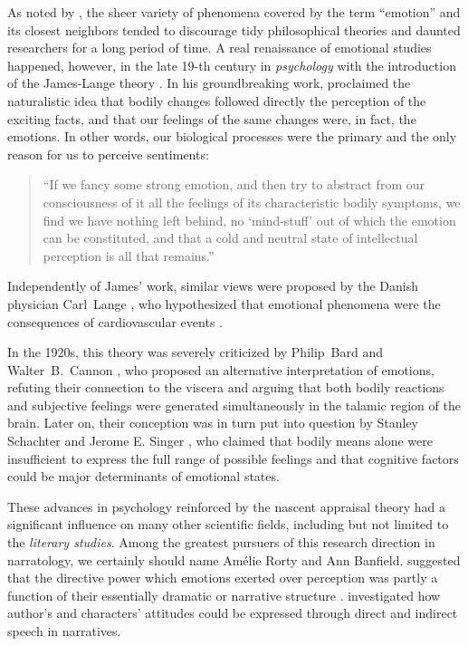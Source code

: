 As noted by \citet{Sousa:14}, the sheer variety of phenomena covered
by the term ``emotion'' and its closest neighbors tended to discourage
tidy philosophical theories and daunted researchers for a long period
of time.  A real renaissance of emotional studies happened, however,
in the late 19-th century in \emph{psychology} with the introduction
of the James-Lange theory \citep{James:1884}.  In his groundbreaking
work, \citeauthor{James:1884} proclaimed the naturalistic idea that
bodily changes followed directly the perception of the exciting facts,
and that our feelings of the same changes were, in fact, the emotions.
In other words, our biological processes were the primary and the only
reason for us to perceive sentiments:
\begin{quote}
``If we fancy some strong emotion, and then try to abstract from our
  consciousness of it all the feelings of its characteristic bodily
  symptoms, we find we have nothing left behind, no `mind-stuff' out
  of which the emotion can be constituted, and that a cold and neutral
  state of intellectual perception is all that
  remains.''\citep[p. 193]{James:1884}
\end{quote}
Independently of James' work, similar views were proposed by the
Danish physician Carl~Lange \citep{Lange:1885}, who hypothesized that
emotional phenomena were the consequences of cardiovascular events
\citep[cf.][]{Lang:94}.

In the 1920s, this theory was severely criticized by Philip~Bard and
Walter~B.~Cannon \citep{Bard:28,Cannon:31}, who proposed an
alternative interpretation of emotions, refuting their connection to
the viscera and arguing that both bodily reactions and subjective
feelings were generated simultaneously in the talamic region of the
brain.  Later on, their conception was in turn put into question by
Stanley Schachter and Jerome E. Singer \citep{Schachter:62}, who
claimed that bodily means alone were insufficient to express the full
range of possible feelings and that cognitive factors could be major
determinants of emotional states. %

These advances in psychology reinforced by the nascent appraisal
theory \citep{Arnold:60} had a significant influence on many other
scientific fields, including but not limited to the \emph{literary
  studies}.  Among the greatest pursuers of this research direction in
narratology, we certainly should name Am\'elie Rorty and Ann Banfield.
\citet{Rorty:80} suggested that the directive power which emotions
exerted over perception was partly a function of their essentially
dramatic or narrative structure \citep[cf.][]{Sousa:14}.
\citet{Banfield:82} investigated how author's and characters'
attitudes could be expressed through direct and indirect speech in
narratives.

